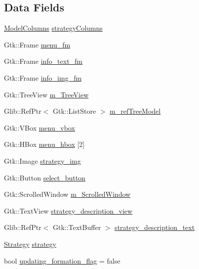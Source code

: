 \subsection*{Data Fields}
\begin{DoxyCompactItemize}
\item 
\hyperlink{class_strategy_g_u_i_1_1_model_columns}{Model\+Columns} \hyperlink{class_strategy_g_u_i_a5dfaa225c4c52a2dfba9a3a5a677a924}{strategy\+Columns}
\item 
Gtk\+::\+Frame \hyperlink{class_strategy_g_u_i_aeffa5af57b84a289f73e852ea21af347}{menu\+\_\+fm}
\item 
Gtk\+::\+Frame \hyperlink{class_strategy_g_u_i_a81adadee3d628dfe9e52b91856313f5d}{info\+\_\+text\+\_\+fm}
\item 
Gtk\+::\+Frame \hyperlink{class_strategy_g_u_i_a496abab2fd8b0a79a7143337ca8bbc3b}{info\+\_\+img\+\_\+fm}
\item 
Gtk\+::\+Tree\+View \hyperlink{class_strategy_g_u_i_a8e921fa14a5dfa50b3c6df24bece55d5}{m\+\_\+\+Tree\+View}
\item 
Glib\+::\+Ref\+Ptr$<$ Gtk\+::\+List\+Store $>$ \hyperlink{class_strategy_g_u_i_ab79147b9b65eeb3fd5b8cfa465ebbcd2}{m\+\_\+ref\+Tree\+Model}
\item 
Gtk\+::\+V\+Box \hyperlink{class_strategy_g_u_i_a22dd39915a18f382a3a85ce9445a46ea}{menu\+\_\+vbox}
\item 
Gtk\+::\+H\+Box \hyperlink{class_strategy_g_u_i_a46039c0024ff8c2ffa23d0c88d52e350}{menu\+\_\+hbox} \mbox{[}2\mbox{]}
\item 
Gtk\+::\+Image \hyperlink{class_strategy_g_u_i_a9758531bf189741b6fb3c034cf3b4bab}{strategy\+\_\+img}
\item 
Gtk\+::\+Button \hyperlink{class_strategy_g_u_i_a9dee0f0a4764ed3e37d046dc2d2ff48d}{select\+\_\+button}
\item 
Gtk\+::\+Scrolled\+Window \hyperlink{class_strategy_g_u_i_a701b920a2ac049a90be53e9f8138ded0}{m\+\_\+\+Scrolled\+Window}
\item 
Gtk\+::\+Text\+View \hyperlink{class_strategy_g_u_i_aa75a678c30dcd633646661fff2978611}{strategy\+\_\+description\+\_\+view}
\item 
Glib\+::\+Ref\+Ptr$<$ Gtk\+::\+Text\+Buffer $>$ \hyperlink{class_strategy_g_u_i_ae4b31c57b6b7f5ecbfbaa6e73e5347d2}{strategy\+\_\+description\+\_\+text}
\item 
\hyperlink{class_strategy}{Strategy} \hyperlink{class_strategy_g_u_i_af8e7b112adca9d3de45cbb0ab00a80bb}{strategy}
\item 
bool \hyperlink{class_strategy_g_u_i_a46f3c766dd61236382cc2681372f6538}{updating\+\_\+formation\+\_\+flag} = false

\end{DoxyCompactItemize}
